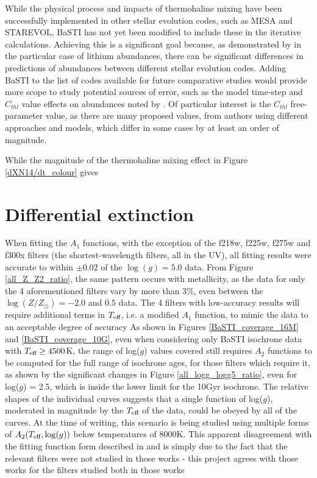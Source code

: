 \documentclass[12pt, a4paper]{report}
\begin{document}
While the physical process and impacts of thermohaline mixing have been successfully implemented in other stellar evolution codes, such as MESA and STAREVOL, BaSTI has not yet been modified to include these in the iterative calculations. Achieving this is a significant goal because, as demonstrated by \cite{2015MNRAS.446.2673L} in the particular case of lithium abundances, there can be significant differences in predictions of abundances between different stellar evolution codes. Adding BaSTI to the list of codes available for future comparative studies would provide more scope to study potential sources of error, such as the model time-step and $C_{thl}$ value effects on abundances noted by \cite{2015MNRAS.446.2673L}. Of particular interest is the $C_{thl}$ free-parameter value, as there are many proposed values, from authors using different approaches and models, which differ in some cases by at least an order of magnitude.

While the magnitude of the thermohaline mixing effect in Figure \ref{dXN14/dt_colour} gives

\section{Differential extinction}
When fitting the $A_{1}$ functions, with the exception of the f218w, f225w, f275w and f300x filters (the shortest-wavelength filters, all in the UV), all fitting results were accurate to within $\pm$0.02 of the $\log(g) = 5.0$ data. From Figure \ref{all_Z_Z2_ratio}, the same pattern occurs with metallicity, as the data for only the 4 aforementioned filters vary by more than 3$\%$, even between the $\log(Z/Z_{\odot}) = -2.0$ and $0.5$ data.
The 4 filters with low-accuracy results will require additional terms in $T_{\textnormal{eff}}$, i.e. a modified  $A_{1}$ function, to mimic the data to an acceptable degree of accuracy
As shown in Figures \ref{BaSTI_coverage_16M} and \ref{BaSTI_coverage_10G}, even when considering only BaSTI isochrone data with $T_{\textnormal{eff}} \geq 4500$K, the range of log($g$) values covered still requires $A_{2}$ functions to be computed for the full range of isochrone ages, for those filters which require it, as shown by the significant changes in Figure \ref{all_logg_logg5_ratio}, even for log($g$) = 2.5, which is inside the lower limit for the 10Gyr isochrone. The relative shapes of the individual curves suggests that a single function of log($g$), moderated in magnitude by the $T_{\textnormal{eff}}$ of the data, could be obeyed by all of the curves. At the time of writing, this scenario is being studied using multiple forms of $A_{2}(T_{\textnormal{eff}},\log(g))$ below temperatures of 8000K. This apparent disagreement with the fitting function form described in \cite{2018MNRAS.475.5023C} and \cite{2018MNRAS.479L.102C} is simply due to the fact that the relevant filters were not studied in those works - this project agrees with those works for the filters studied both in those works
\end{document}
